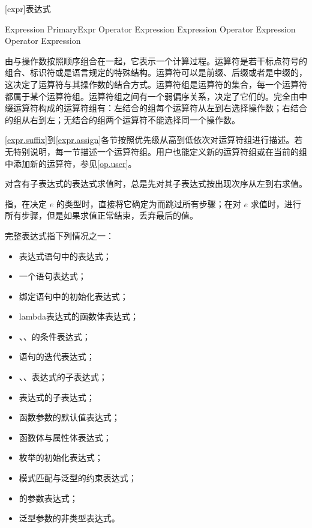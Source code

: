 
[expr]{表达式}

\begin{bnf}{Expression}
    PrimaryExpr \br
    Operator Expression \br
    Expression Operator \br
    Expression Operator Expression
\end{bnf}

\pnum
{}由与操作数按照顺序组合在一起，它表示一个计算过程。运算符是若干标点符号的组合、标识符或是语言规定的特殊结构。运算符可以是前缀、后缀或者是中缀的，这决定了运算符与其操作数的结合方式。运算符组是运算符的集合，每一个运算符都属于某个运算符组。运算符组之间有一个弱偏序关系，决定了它们的。完全由中缀运算符构成的运算符组有：左结合的组每个运算符从左到右选择操作数；右结合的组从右到左；无结合的组两个运算符不能选择同一个操作数。

\pnum
\ref{expr.suffix}到\ref{expr.assign}各节按照优先级从高到低依次对运算符组进行描述。若无特别说明，每一节描述一个运算符组。用户也能定义新的运算符组或在当前的组中添加新的运算符，参见\ref{op.user}。

\pnum
对含有子表达式的表达式求值时，总是先对其子表达式按出现次序从左到右求值。

\pnum
{}指，在决定 $e$ 的类型时，直接将它确定为而跳过所有步骤；在对 $e$ 求值时，进行所有步骤，但是如果求值正常结束，丢弃最后的值。

\pnum
完整表达式指下列情况之一：

\begin{itemize}
    \item 表达式语句中的表达式；
    \item 一个语句表达式；
    \item 绑定语句中的初始化表达式；
    \item lambda表达式的函数体表达式；
    \item {}、、的条件表达式；
    \item {}语句的迭代表达式；
    \item {}、、表达式的子表达式；
    \item {}表达式的子表达式；
    \item 函数参数的默认值表达式；
    \item 函数体与属性体表达式；
    \item 枚举的初始化表达式；
    \item 模式匹配与泛型的约束表达式；
    \item {}的参数表达式；
    \item 泛型参数的非类型表达式。
\end{itemize}

